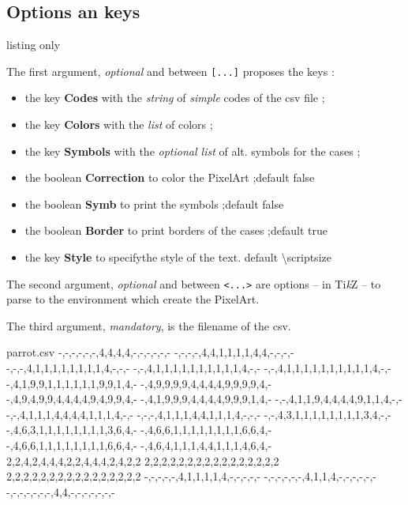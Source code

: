 \documentclass{article}
\newcommand\Cle[1]{{\bfseries\sffamily\textlangle #1\textrangle}}
\begin{document}
\pagebreak

\subsection{Options an keys}

\begin{PresentationCode}{listing only}
\end{PresentationCode}

The first argument, \textit{optional} and between \texttt{[...]} proposes the \textsf{keys} :

\begin{itemize}
	\item the key \Cle{Codes} with the \textit{string} of \textit{simple} codes of the \textsf{csv} file ;
	\item the key \Cle{Colors} with the \textit{list} of colors ;
	\item the key \Cle{Symbols} with the \textit{optional list} of alt. symbols for the cases ;
	\item the boolean \Cle{Correction} to color the PixelArt ;\hfill{}default \textsf{false}
	\item the boolean \Cle{Symb} to print the symbols ;\hfill{}default \textsf{false}
	\item the boolean \Cle{Border} to print borders of the cases ;\hfill{}default \textsf{true}
	\item the key \Cle{Style} to specifythe style of the text. \hfill{}default \textsf{\textbackslash scriptsize}
\end{itemize}

The second argument, \textit{optional} and between \texttt{<...>} are options -- in  Ti\textit{k}Z -- to parse to the environment which create the PixelArt.

\medskip

The third argument, \textit{mandatory}, is the filename of the \textsf{csv}.


\begin{PresentationCode}{}
\begin{filecontents*}[overwrite]{parrot.csv}
	-,-,-,-,-,-,4,4,4,4,-,-,-,-,-,-
	-,-,-,-,4,4,1,1,1,1,4,4,-,-,-,-
	-,-,-,4,1,1,1,1,1,1,1,1,4,-,-,-
	-,-,4,1,1,1,1,1,1,1,1,1,1,4,-,-
	-,-,4,1,1,1,1,1,1,1,1,1,1,4,-,-
	-,4,1,9,9,1,1,1,1,1,1,9,9,1,4,-
	-,4,9,9,9,9,4,4,4,4,9,9,9,9,4,-
	-,4,9,4,9,9,4,4,4,4,9,4,9,9,4,-
	-,4,1,9,9,9,4,4,4,4,9,9,9,1,4,-
	-,-,4,1,1,9,4,4,4,4,9,1,1,4,-,-
	-,-,4,1,1,1,4,4,4,4,1,1,1,4,-,-
	-,-,-,4,1,1,1,4,4,1,1,1,4,-,-,-
	-,-,4,3,1,1,1,1,1,1,1,1,3,4,-,-
	-,4,6,3,1,1,1,1,1,1,1,1,3,6,4,-
	-,4,6,6,1,1,1,1,1,1,1,1,6,6,4,-
	-,4,6,6,1,1,1,1,1,1,1,1,6,6,4,-
	-,4,6,4,1,1,1,4,4,1,1,1,4,6,4,-
	2,2,4,2,4,4,4,2,2,4,4,4,2,4,2,2
	2,2,2,2,2,2,2,2,2,2,2,2,2,2,2,2
	2,2,2,2,2,2,2,2,2,2,2,2,2,2,2,2
	-,-,-,-,-,4,1,1,1,1,4,-,-,-,-,-
	-,-,-,-,-,-,4,1,1,4,-,-,-,-,-,-
	-,-,-,-,-,-,-,4,4,-,-,-,-,-,-,-
\end{filecontents*}
\end{PresentationCode}
\end{document}
